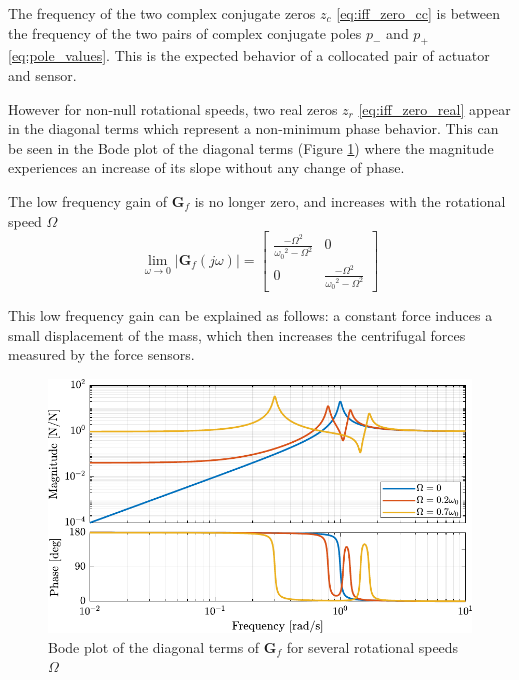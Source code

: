 \documentclass{ISMA_USD2020}
\begin{document}
The frequency of the two complex conjugate zeros \(z_c\) \eqref{eq:iff_zero_cc} is between the frequency of the two pairs of complex conjugate poles \(p_{-}\) and \(p_{+}\) \eqref{eq:pole_values}.
This is the expected behavior of a collocated pair of actuator and sensor.

However for non-null rotational speeds, two real zeros \(z_r\) \eqref{eq:iff_zero_real} appear in the diagonal terms which represent a non-minimum phase behavior.
This can be seen in the Bode plot of the diagonal terms (Figure \ref{fig:plant_iff_compare_rotating_speed}) where the magnitude experiences an increase of its slope without any change of phase.

The low frequency gain of \(\bm{G}_f\) is no longer zero, and increases with the rotational speed \(\Omega\)
\begin{equation}
\label{low_freq_gain_iff_plan}
  \lim_{\omega \to 0} \left| \bm{G}_f (j\omega) \right| = \begin{bmatrix}
  \frac{- \Omega^2}{{\omega_0}^2 - \Omega^2} & 0 \\
  0  & \frac{- \Omega^2}{{\omega_0}^2 - \Omega^2}
\end{bmatrix}
\end{equation}

This low frequency gain can be explained as follows: a constant force induces a small displacement of the mass, which then increases the centrifugal forces measured by the force sensors.

\begin{figure}[htbp]
\centering
\includegraphics[scale=1]{figs/plant_iff_compare_rotating_speed.pdf}
\caption{\label{fig:plant_iff_compare_rotating_speed}Bode plot of the diagonal terms of \(\bm{G}_f\) for several rotational speeds \(\Omega\)}
\end{figure}
\end{document}
